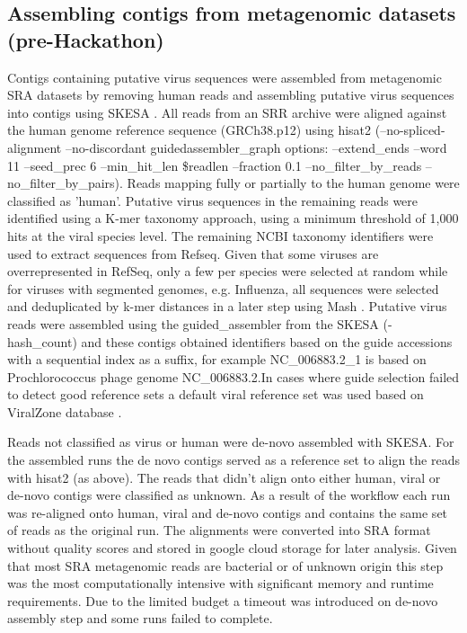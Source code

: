 \documentclass[genes, moreauthors]{Definitions/mdpi}
\begin{document}
  \subsection{Assembling contigs from metagenomic datasets (pre-Hackathon)}
  Contigs containing putative virus sequences were assembled from metagenomic
  SRA datasets by removing human reads and assembling putative virus sequences
  into contigs using SKESA \cite{Souvorov2018}. All reads from an SRR archive were aligned
  against the human genome reference sequence (GRCh38.p12) using hisat2
  \cite{Kim2015} (--no-spliced-alignment --no-discordant guidedassembler\_graph
  options: --extend\_ends  --word 11 --seed\_prec 6 --min\_hit\_len \$readlen
  --fraction 0.1 --no\_filter\_by\_reads --no\_filter\_by\_pairs). Reads mapping
  fully or partially  to the human genome were  classified as 'human'. Putative
  virus sequences in the remaining reads were identified using a K-mer taxonomy
  approach, using a minimum threshold of 1,000 hits at the viral species level.
  The remaining NCBI taxonomy identifiers were used to extract sequences from
  Refseq. Given that some viruses are overrepresented in RefSeq,  only a few
  per species were selected at random while for viruses with segmented genomes,
  e.g. Influenza, all sequences were selected and deduplicated by k-mer
  distances in a later step using Mash \cite{Ondov2019}. Putative virus reads were
  assembled using the guided\_assembler from the SKESA (-hash\_count) and these
  contigs obtained identifiers based on the guide accessions with a sequential
  index as a suffix, for example NC\_006883.2\_1 is based on Prochlorococcus
  phage genome NC\_006883.2.In cases where guide selection failed to detect good
  reference sets a default viral reference set was used based on ViralZone
  database \cite{Hulo2011}.

  Reads not classified as virus or human were de-novo assembled with SKESA. For
  the assembled runs the de novo contigs served as a reference set to align the
  reads with hisat2 (as above). The reads that didn't align onto either human,
  viral or de-novo contigs were classified as unknown. As a result of the
  workflow each run was re-aligned onto human, viral and de-novo contigs and
  contains the same set of reads as the original run. The alignments were
  converted into SRA format without quality scores and stored in google cloud
  storage for later analysis. Given that most SRA metagenomic reads are
  bacterial or of unknown origin this step was the most computationally
  intensive with significant memory and runtime requirements. Due to the
  limited budget a timeout was introduced on de-novo assembly step and some
  runs failed to complete.
\end{document}
